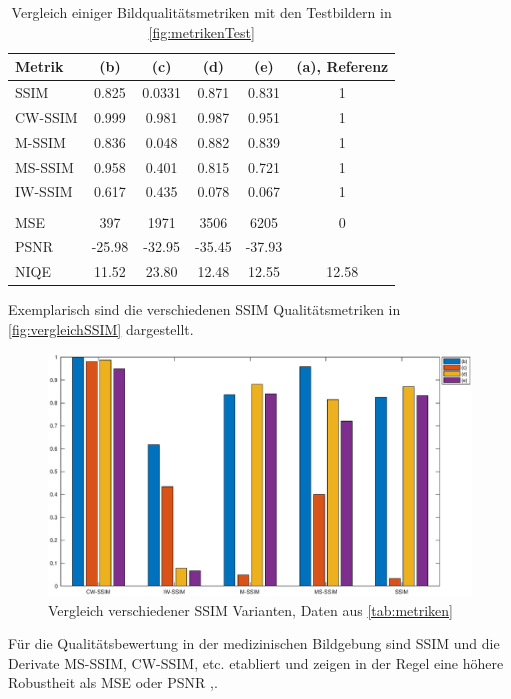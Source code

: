 \begin{table}[H]
	\centering
	\caption[Vergleich Bildqualitätsmetriken]{Vergleich einiger Bildqualitätsmetriken mit den Testbildern in \autoref{fig:metrikenTest}}
	\label{tab:metriken}
	\begin{tabular}{lSSSSS}
		\toprule
		\textbf{Metrik} & \textbf{(b)} & \textbf{(c)} & \textbf{(d)} & \textbf{(e)} & \textbf{(a), Referenz} \\
		\midrule
		SSIM    & 0.825 & 0.0331 & 0.871 & 0.831 & 1 \\
		CW-SSIM & 0.999 & 0.981  & 0.987 & 0.951 & 1 \\
		M-SSIM  & 0.836 & 0.048  & 0.882 & 0.839 & 1 \\
		MS-SSIM & 0.958 & 0.401  & 0.815 & 0.721 & 1 \\
		IW-SSIM & 0.617 & 0.435  & 0.078 & 0.067 & 1 \\
		& & & & & \\
		MSE     & 397     & 1971     & 3506    & 6205    & 0 \\
		PSNR    & -25.98  & -32.95   & -35.45  & -37.93  &  \\
		NIQE    & 11.52   & 23.80    & 12.48   & 12.55   & 12.58 \\
		\bottomrule
	\end{tabular}
\end{table}

Exemplarisch sind die verschiedenen SSIM Qualitätsmetriken in \autoref{fig:vergleichSSIM} dargestellt.

\begin{figure}[H]
	\centering
	\includegraphics[width=\textwidth]{img/metrics/ssimComp.eps}
	\caption[Vergleich verschiedener SSIM Varianten]{Vergleich verschiedener SSIM Varianten, Daten aus \autoref{tab:metriken}}
	\label{fig:vergleichSSIM}
\end{figure}

Für die Qualitätsbewertung in der medizinischen Bildgebung sind SSIM und die Derivate MS-SSIM, CW-SSIM, etc. etabliert und zeigen in der Regel eine höhere Robustheit als MSE oder PSNR \cite{Punga2014},\cite{VenkatNarayanaRao2013}.















